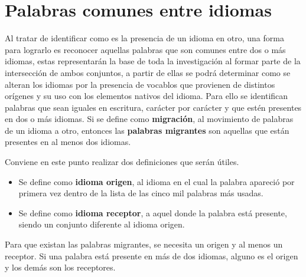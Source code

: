 \section{Palabras comunes entre idiomas} %

Al tratar de identificar como es la presencia de un idioma en otro, una forma
para lograrlo es reconocer aquellas palabras que son comunes entre dos o más
idiomas,  estas representarán la base de toda la investigación al formar parte
de la intersección de ambos conjuntos, a partir de ellas se podrá determinar
como se alteran los idiomas por la presencia de vocablos que provienen de
distintos orígenes y su uso con los elementos nativos del idioma.  Para ello se
identifican palabras que sean iguales en escritura, carácter por carácter y que
estén presentes en dos o más idiomas.  Si se define como \textbf{migración}, al
movimiento de palabras de un idioma a otro, entonces las \textbf{palabras
migrantes}  son aquellas que están presentes en al menos dos idiomas.  

Conviene en este punto realizar dos definiciones que serán útiles.
\begin{itemize}
\item 
Se define como  \textbf{idioma origen}, al idioma en el cual la palabra
apareció por primera vez dentro de la lista de las cinco mil palabras más
usadas.  
\item 
Se define como \textbf{idioma receptor}, a  aquel donde la palabra está
presente, siendo un conjunto diferente al idioma origen.  
\end{itemize}

Para que existan las palabras migrantes, se necesita un origen y al menos un
receptor. Si una palabra está presente en más de dos idiomas, alguno es el
origen y los demás son los receptores. 

